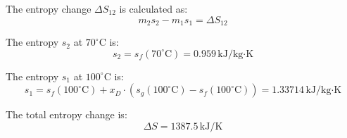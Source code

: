 The entropy change \( \Delta S_{12} \) is calculated as:  
\[
m_2 s_2 - m_1 s_1 = \Delta S_{12}
\]  

The entropy \( s_2 \) at \( 70^\circ\text{C} \) is:  
\[
s_2 = s_f(70^\circ\text{C}) = 0.959 \, \text{kJ/kg·K}
\]  

The entropy \( s_1 \) at \( 100^\circ\text{C} \) is:  
\[
s_1 = s_f(100^\circ\text{C}) + x_D \cdot (s_g(100^\circ\text{C}) - s_f(100^\circ\text{C})) = 1.33714 \, \text{kJ/kg·K}
\]  

The total entropy change is:  
\[
\Delta S = 1387.5 \, \text{kJ/K}
\]